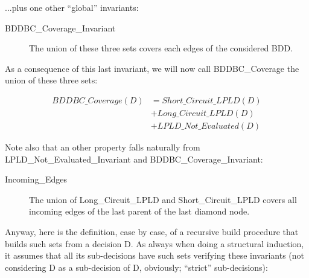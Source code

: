 \documentclass[a4paper,12pt,twoside]{article}
\begin{document}
...plus one other ``global'' invariants:

\begin{description}
\item[BDDBC\_Coverage\_Invariant]
 The union of these three sets covers each edges of the considered
 BDD.
\end{description}

As a consequence of this last invariant, we will now call
BDDBC\_Coverage the union of these three sets:

\begin{align*}
  BDDBC\_Coverage(D) & = Short\_Circuit\_LPLD(D)\\
                     & + Long\_Circuit\_LPLD(D)\\
                     & + LPLD\_Not\_Evaluated(D)
\end{align*}

Note also that an other property falls naturally from
LPLD\_Not\_Evaluated\_Invariant and BDDBC\_Coverage\_Invariant:

\begin{description}
\item[Incoming\_Edges]
  The union of Long\_Circuit\_LPLD and Short\_Circuit\_LPLD covers all incoming
  edges of the last parent of the last diamond node.
\end{description}

Anyway, here is the definition, case by case, of a recursive build
procedure that builds such sets from a decision D. As always when
doing a structural induction, it assumes that all its sub-decisions
have such sets verifying these invariants (not considering D as a
sub-decision of D, obviously; ``strict'' sub-decisions):
\end{document}
